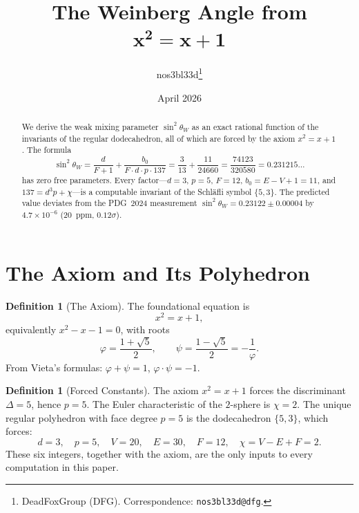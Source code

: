 \documentclass[11pt,a4paper]{article}
\theoremstyle{plain}
\theoremstyle{definition}
\newtheorem{definition}[theorem]{Definition}
\newcommand{\sw}{\sin^{2}\!\theta_{W}}
\newcommand{\vp}{\varphi}
\begin{document}
\title{%
  \textbf{The Weinberg Angle from}\\[4pt]
  $\boldsymbol{x^2 = x + 1}$%
}
\author{%
  nos3bl33d\thanks{%
    DeadFoxGroup (DFG). Correspondence: \texttt{nos3bl33d@dfg}.%
  }%
}
\date{April 2026}

\maketitle

\begin{abstract}
We derive the weak mixing parameter $\sw$ as an exact rational
function of the invariants of the regular dodecahedron, all of which
are forced by the axiom $x^{2}=x+1$.  The formula
\[
  \sw
  = \frac{d}{F+1} + \frac{b_{0}}{F \cdot d \cdot p \cdot 137}
  = \frac{3}{13} + \frac{11}{24660}
  = \frac{74123}{320580}
  = 0.231215\ldots
\]
has zero free parameters.  Every factor---$d=3$, $p=5$, $F=12$,
$b_{0} = E - V + 1 = 11$, and $137 = d^{3}p + \chi$---is a
computable invariant of the Schl\"{a}fli symbol $\{5,3\}$.  The
predicted value deviates from the PDG~2024 measurement
$\sw = 0.23122 \pm 0.00004$ by $4.7 \times 10^{-6}$
(20~ppm, $0.12\sigma$).
\end{abstract}

\tableofcontents

\section{The Axiom and Its Polyhedron}\label{sec:axiom}

\begin{definition}[The Axiom]\label{def:axiom}
The foundational equation is
\begin{equation}\label{eq:axiom}
  x^{2} = x + 1,
\end{equation}
equivalently $x^{2} - x - 1 = 0$, with roots
\begin{equation}\label{eq:roots}
  \vp = \frac{1+\sqrt{5}}{2}, \qquad
  \psi = \frac{1-\sqrt{5}}{2} = -\frac{1}{\vp}.
\end{equation}
From Vieta's formulas: $\vp + \psi = 1$, $\vp \cdot \psi = -1$.
\end{definition}

\begin{definition}[Forced Constants]\label{def:forced}
The axiom $x^{2} = x + 1$ forces the discriminant $\Delta = 5$, hence
$p = 5$.  The Euler characteristic of the $2$-sphere is $\chi = 2$.
The unique regular polyhedron with face degree $p = 5$ is the
dodecahedron $\{5,3\}$, which forces:
\begin{equation}\label{eq:dodec-data}
  d = 3, \quad p = 5, \quad V = 20, \quad E = 30, \quad F = 12, \quad
  \chi = V - E + F = 2.
\end{equation}
These six integers, together with the axiom, are the only inputs to
every computation in this paper.
\end{definition}
\end{document}

